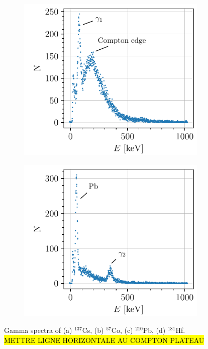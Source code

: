 \begin{figure}[htbp]
\begin{subfigure}{0.495\textwidth}
        \includegraphics[scale=1]{figures/pb210_spectrum.pdf}
        \caption{}
    \end{subfigure}
    \hfill
    \begin{subfigure}{0.495\textwidth}
        \includegraphics[scale=1]{figures/hf181_spectrum.pdf}
        \caption{}
    \end{subfigure}
    \caption{Gamma spectra of (a) $^{137}$Cs, (b) $^{57}$Co, (c) $^{210}$Pb, (d) $^{181}$Hf. \hl{METTRE LIGNE HORIZONTALE AU COMPTON PLATEAU}}
    \label{fig:gamma_spectra}
\end{figure}


